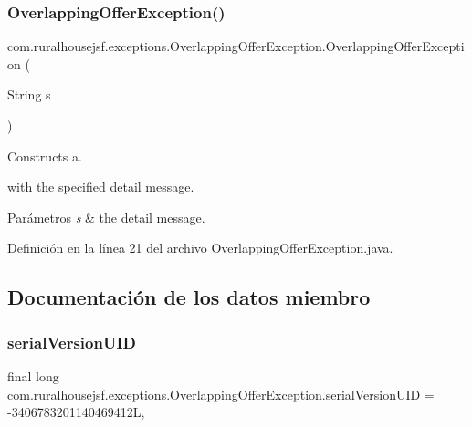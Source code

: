\subsubsection{\texorpdfstring{OverlappingOfferException()}{OverlappingOfferException()}\hspace{0.1cm}{\footnotesize\ttfamily [2/2]}}
{\footnotesize\ttfamily com.\+ruralhousejsf.\+exceptions.\+Overlapping\+Offer\+Exception.\+Overlapping\+Offer\+Exception (\begin{DoxyParamCaption}\item[{String}]{s }\end{DoxyParamCaption})}



Constructs a. 


\begin{DoxyCode}{0}
\end{DoxyCode}
 with the specified detail message.


\begin{DoxyParams}{Parámetros}
{\em s} & the detail message. \\
\hline
\end{DoxyParams}


Definición en la línea 21 del archivo Overlapping\+Offer\+Exception.\+java.



\subsection{Documentación de los datos miembro}
\mbox{\label{classcom_1_1ruralhousejsf_1_1exceptions_1_1_overlapping_offer_exception_aaff379d27ee36188b92cd4ed2ee2010e}} 
\subsubsection{\texorpdfstring{serialVersionUID}{serialVersionUID}}
{\footnotesize\ttfamily final long com.\+ruralhousejsf.\+exceptions.\+Overlapping\+Offer\+Exception.\+serial\+Version\+U\+ID = -\/3406783201140469412L\hspace{0.3cm}{\ttfamily [static]}, {\ttfamily [private]}}



